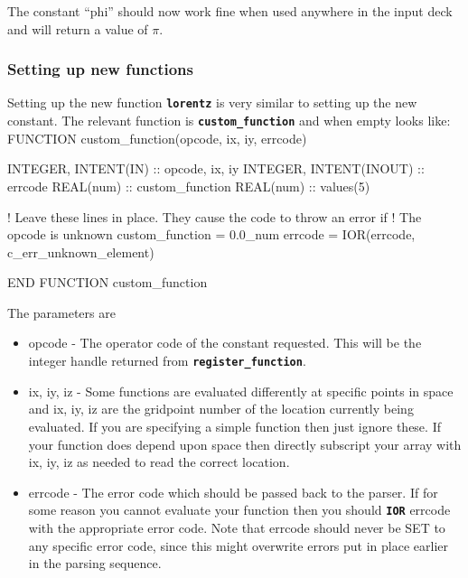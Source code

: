 \documentclass[12pt,a4paper]{article}
\newcommand{\inlinecode}[1]{{\color{warwickred} \bf\texttt{#1}}}
\newenvironment{boxverbatim}{\lboxverbatim{none}}{\endlboxverbatim}
\begin{document}
The constant ``phi'' should now work fine when used anywhere in the input deck
and will return a value of $\pi$.

\subsubsection{Setting up new functions}

Setting up the new function \inlinecode{lorentz} is very similar to setting up
the new constant. The relevant function is \inlinecode{custom\_function} and
when empty looks like:
\begin{boxverbatim}
FUNCTION custom_function(opcode, ix, iy, errcode)

  INTEGER, INTENT(IN) :: opcode, ix, iy
  INTEGER, INTENT(INOUT) :: errcode
  REAL(num) :: custom_function
  REAL(num) :: values(5)

  ! Leave these lines in place. They cause the code to throw an error if
  ! The opcode is unknown
  custom_function = 0.0_num
  errcode = IOR(errcode, c_err_unknown_element)

END FUNCTION custom_function
\end{boxverbatim}

The parameters are

\begin{itemize}
\item opcode - The operator code of the constant requested. This will be the
  integer handle returned from \inlinecode {register\_function}.
\item ix, iy, iz - Some functions are evaluated differently at specific points
  in space and ix, iy, iz are the gridpoint number of the location currently
  being evaluated. If you are specifying a simple function then just
  ignore these. If your function does depend upon space then directly
  subscript your array with ix, iy, iz as needed to read the correct location.
\item errcode - The error code which should be passed back to the
  parser. If for some reason you cannot evaluate your function then you should
  \inlinecode{IOR} errcode with the appropriate error code. Note that errcode
  should never be SET to any specific error code, since this might overwrite
  errors put in place earlier in the parsing sequence.
\end{itemize}
\end{document}
